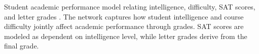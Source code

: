 Student academic performance model relating intelligence, difficulty, SAT scores, and letter grades \cite{koller2009probabilistic}. The network captures how student intelligence and course difficulty jointly affect academic performance through grades. SAT scores are modeled as dependent on intelligence level, while letter grades derive from the final grade.
